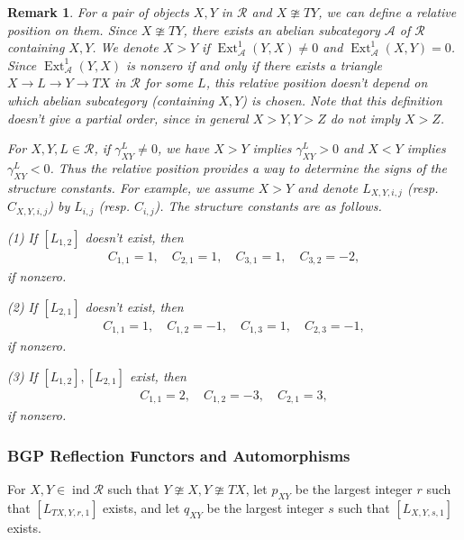\documentclass[12pt]{amsart}
\newtheorem{remark}[theorem]{Remark}
\begin{document}
\begin{remark}
    For a pair of objects $X,Y$ in $\mathcal{R}$ and $X\ncong TY$, we can define a relative position on them.
    Since $X\ncong TY$, there exists an abelian subcategory $\mathcal{A}$ of $\mathcal{R}$ containing $X,Y$.
    We denote $X>Y$ if $\operatorname{Ext}_{\mathcal{A}}^1(Y,X)\neq 0$ and $\operatorname{Ext}_{\mathcal{A}}^1(X,Y)=0$.
    Since $\operatorname{Ext}_{\mathcal{A}}^1(Y,X)$ is nonzero if and only if there exists a triangle $X\rightarrow L \rightarrow Y \rightarrow TX$ in $\mathcal{R}$ for some $L$, this relative position doesn't depend on which abelian subcategory (containing $X,Y$) is chosen.
    Note that this definition doesn't give a partial order, since in general $X>Y,Y>Z$ do not imply $X>Z$.

    For $X,Y,L\in \mathcal{R}$, if $\gamma_{XY}^L\neq 0$, we have $X>Y$ implies $\gamma_{XY}^L>0$ and $X<Y$ implies $\gamma_{XY}^L<0$.
    Thus the relative position provides a way to determine the signs of the structure constants.
    For example, we assume $X>Y$ and denote $L_{X,Y,i,j}$ (resp. $C_{X,Y,i,j}$) by $L_{i,j}$ (resp. $C_{i,j}$).
    The structure constants are as follows.

    (1) If $[L_{1,2}]$ doesn't exist, then 
    \begin{align*}
        C_{1,1}=1, \quad C_{2,1}=1, \quad C_{3,1}=1, \quad C_{3,2}=-2,
    \end{align*}
    if nonzero.

    (2) If $[L_{2,1}]$ doesn't exist, then 
    \begin{align*}
        C_{1,1}=1,\quad C_{1,2}=-1,\quad C_{1,3}=1, \quad C_{2,3}=-1,
    \end{align*}
    if nonzero.

    (3) If $[L_{1,2}],[L_{2,1}]$ exist, then 
    \begin{align*}
        C_{1,1}=2, \quad C_{1,2}=-3, \quad C_{2,1}=3,
    \end{align*}
    if nonzero.
\end{remark}

\subsubsection{BGP Reflection Functors and Automorphisms}

For $X,Y \in \operatorname{ind}\mathcal{R}$ such that $Y \ncong X, Y \ncong TX$, 
let $p_{XY}$ be the largest integer $r$ such that $[L_{TX,Y,r,1}]$ exists, 
and let $q_{XY}$ be the largest integer $s$ such that $[L_{X,Y,s,1}]$ exists. 
\end{document}
